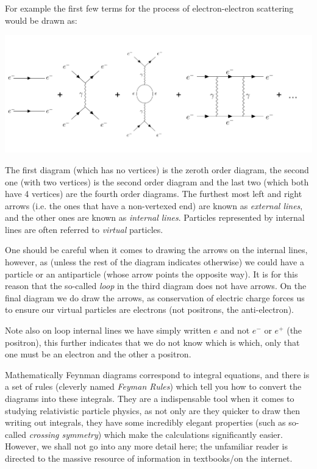 For example the first few terms for the process of electron-electron scattering would be drawn as:

\begin{center}
\includegraphics[scale=0.45, origin=c]{graphics/Feynman.pdf}
\end{center}

The first diagram (which has no vertices) is the zeroth order diagram, the second one (with two vertices) is the second order diagram and the last two (which both have 4 vertices) are the fourth order diagrams. The furthest most left and right arrows (i.e. the ones that have a non-vertexed end) are known as \emph{external lines}, and the other ones are known as \emph{internal lines}. Particles represented by internal lines are often referred to \emph{virtual} particles. 

\br 
One should be careful when it comes to drawing the arrows on the internal lines, however, as (unless the rest of the diagram indicates otherwise) we could have a particle or an antiparticle (whose arrow points the opposite way). It is for this reason that the so-called \emph{loop} in the third diagram does not have arrows. On the final diagram we do draw the arrows, as conservation of electric charge forces us to ensure our virtual particles are electrons (not positrons, the anti-electron). 

Note also on loop internal lines we have simply written $e$ and not $e^-$ or $e^+$ (the positron), this further indicates that we do not know which is which, only that one must be an electron and the other a positron. 
\er 

Mathematically Feynman diagrams correspond to integral equations, and there is a set of rules (cleverly named \emph{Feyman Rules}) which tell you how to convert the diagrams into these integrals. They are a indispensable tool when it comes to studying relativistic particle physics, as not only are they quicker to draw then writing out integrals, they have some incredibly elegant properties (such as so-called \emph{crossing symmetry}) which make the calculations significantly easier. However, we shall not go into any more detail here; the unfamiliar reader is directed to the massive resource of information in textbooks/on the internet. 